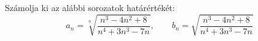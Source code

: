 \documentclass[11pt]{scrartcl}
\begin{document}
Számolja ki az alábbi sorozatok határértékét:
\[
	a_n = \sqrt[n]{\frac{n^3 - 4n^2 + 8}{n^4 + 3n^3 - 7n}}, \qquad
	b_n = \sqrt{\frac{n^3 - 4n^2 + 8}{n^4 + 3n^3 - 7n}}
\]
\end{document}
